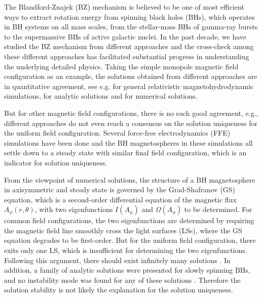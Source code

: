 \documentclass[aps,prd,reprint,nofootinbib, superscriptaddress]{revtex4-1}
\def\Ap{A_\phi}
\begin{document}
The Blandford-Znajek (BZ) mechanism \cite{Blandford1977} is believed to be
one of most efficient ways to extract rotation energy from spinning black holes (BHs),
which operates in BH systems on all mass scales, from the stellar-mass BHs of gamma-ray
bursts to the supermassive BHs of active galactic nuclei. In the past decade,
we have studied the BZ mechanism from different approaches and the cross-check among
these different approaches has facilitated substantial progress in understanding the underlying
detailed physics. Taking the simple monopole magnetic field
configuration as an example, the solutions obtained from different approaches
are in quantitative agreement,  see e.g. \cite{Komissarov2001,Komissarov2004,Komissarov2004e, McKinney2004}
for general relativistic magnetohydrodynamic simulations,
\cite{Tanabe2008,Pan2015,Pan2015b, Gralla2014, Gralla2015, Penna2015, Grignani2018} for analytic solutions
and \cite{Contopoulos2013,Nathanail2014,Mahlmann2018} for numerical solutions.

But for other magnetic field configurations, there is no such good agreement, e.g.,
different approaches do not even reach a consensus on the solution uniqueness for the uniform field configuration.
Several force-free electrodynamics (FFE) simulations \cite{Komissarov2004e, Komissarov2005,
Komissarov2007,Palenzuela2010,Paschalidis2013,Yang2015,Carrasco2017} have been done and
the BH magnetospheres in these simulations all settle down to a steady state with similar final field configuration,
which is an indicator for solution uniqueness.

From the viewpoint of numerical solutions, the structure of a BH magnetosphere in axisymmetric and
steady state is governed by the Grad-Shafranov (GS) equation, which is a second-order differential equation of
the magnetic flux $\Ap(r,\theta)$, with two eigenfunctions $I(\Ap)$ and $\Omega(\Ap)$ to be
determined. For common field configurations, the two eigenfunctions are determined by requiring the
magnetic field line smoothly cross the light surfaces (LSs), where the GS equation degrades to be first-order.
But for the uniform field configuration, there exits only one LS, which is insufficient for determining
the two eigenfunctions. Following this argument, there should exist infinitely many solutions \cite{Nathanail2014}.
In addition, a family of analytic solutions were presented for slowly spinning BHs,
and no instability mode was found for any of these solutions \cite{Yang2015}. Therefore the solution stability
is not likely the explanation for the solution uniqueness.
\end{document}
